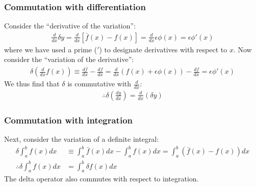 \subsubsection{Commutation with differentiation}
Consider the ``derivative of the variation'':
\begin{align}
\frac{d}{dx}\delta y =\frac{d}{dx} \left[\bar{f}(x)-f(x) \right]=\frac{d}{dx} \epsilon \phi(x)=\epsilon \phi'(x)
\end{align}
where we have used a prime ($'$) to designate derivatives with respect to $x$. Now consider the ``variation of the derivative'':
\begin{align}
\delta \left(\frac{d}{dx}f(x)\right) \equiv \frac{d\bar{f}}{dx}-\frac{df}{dx} = \frac{d}{dx} (f(x)+\epsilon \phi(x)) - \frac{df}{dx} = \epsilon \phi'(x)
\end{align}
We thus find that $\delta$ is commutative with $\frac{d}{dx}$:
\begin{align}
\label{eqn:vardiffcommut}
\therefore \delta \left(\frac{dy}{dx}\right) = \frac{d}{dx}\left(\delta y\right)
\end{align}
\subsubsection{Commutation with integration}
Next, consider the variation of a definite integral:
\begin{align}
\delta \int_a^b f(x) dx &\equiv  \int_a^b \bar{f}(x) dx - \int_a^b f(x) dx = \int_a^b (\bar{f}(x)-f(x)) dx\nonumber\\
\therefore \delta \int_a^b f(x) dx &= \int_a^b \delta f(x) dx 
\end{align}
The delta operator also commutes with respect to integration.
